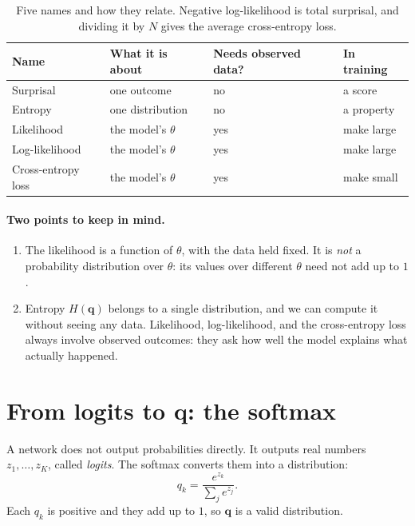\documentclass[12pt,a4paper]{article}
\begin{document}
\begin{table}[ht]
\centering
\begin{tabular}{llll}
  \toprule
  Name & What it is about & Needs observed data? & In training \\
  \midrule
  Surprisal & one outcome & no & a score \\
  Entropy & one distribution & no & a property \\
  Likelihood & the model's $\theta$ & yes & make large \\
  Log-likelihood & the model's $\theta$ & yes & make large \\
  Cross-entropy loss & the model's $\theta$ & yes & make small \\
  \bottomrule
\end{tabular}
\caption{Five names and how they relate. Negative
log-likelihood is total surprisal, and dividing it by $N$
gives the average cross-entropy loss.}
\label{tab:names}
\end{table}

\paragraph{Two points to keep in mind.}
\begin{enumerate}
  \item The likelihood is a function of $\theta$, with the
  data held fixed. It is \emph{not} a probability
  distribution over $\theta$: its values over different
  $\theta$ need not add up to $1$.
  \item Entropy $H(\symbf{q})$ belongs to a single
  distribution, and we can compute it without seeing any
  data. Likelihood, log-likelihood, and the cross-entropy
  loss always involve observed outcomes: they ask how well
  the model explains what actually happened.
\end{enumerate}

\section{From logits to $\symbf{q}$: the softmax}

A network does not output probabilities directly.
It outputs real numbers $z_1, \dots, z_K$,
called \emph{logits}. The softmax converts them
into a distribution:
\begin{equation}
  q_k = \frac{e^{z_k}}{\sum_{j} e^{z_j}} .
  \label{eq:softmax}
\end{equation}
Each $q_k$ is positive and they add up to $1$,
so $\symbf{q}$ is a valid distribution.
\end{document}
